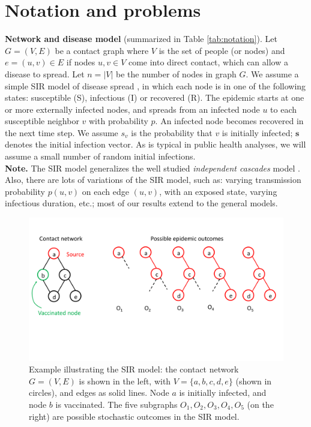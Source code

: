 \section{Notation and problems}
\label{sec:prelim}

\noindent
\textbf{Network and disease model} (summarized in Table \ref{tab:notation}).
Let $G = (V, E)$ be a contact graph where $V$ is the set of people (or nodes) and $e = (u, v) \in E$ if nodes $u, v \in V$ come into direct contact, which can allow a disease to spread. Let $n = |V|$ be the number of nodes in graph $G$. 
We assume a simple SIR model of disease spread \cite{marathe:cacm13}, in which each node is in one of the following states:
susceptible (S), infectious (I) or recovered (R).
The epidemic starts at one or more externally infected nodes, and spreads from an infected node $u$ to each susceptible
neighbor $v$ with probability $p$. An infected node becomes recovered in the next time step.
We assume $s_v$ is the probability that $v$ is initially infected; $\mathbf{s}$ denotes the initial infection vector.
As is typical in public health analyses, we will assume a small number of random initial infections.\\
\textbf{Note.} The SIR model generalizes the well studied \emph{independent cascades} model \cite{kempe:kdd03}.
Also, there are lots of variations of the SIR model, such as:
varying transmission probability $p(u, v)$ on each edge $(u, v)$,
with an exposed state, varying infectious duration, etc.;
most of our results extend to the general models.

\begin{figure}
\includegraphics[scale=0.25]{figures/example.pdf}
\caption{Example illustrating the SIR model: the contact network $G=(V, E)$ is shown in the left,
with $V=\{a, b, c, d, e\}$ (shown in circles), and edges as solid lines.
Node $a$ is initially infected, and node $b$ is vaccinated. The five subgraphs $O_1, O_2, O_3, O_4, O_5$
(on the right) are possible stochastic outcomes in the SIR model.}
\label{fig:example}
\end{figure}


